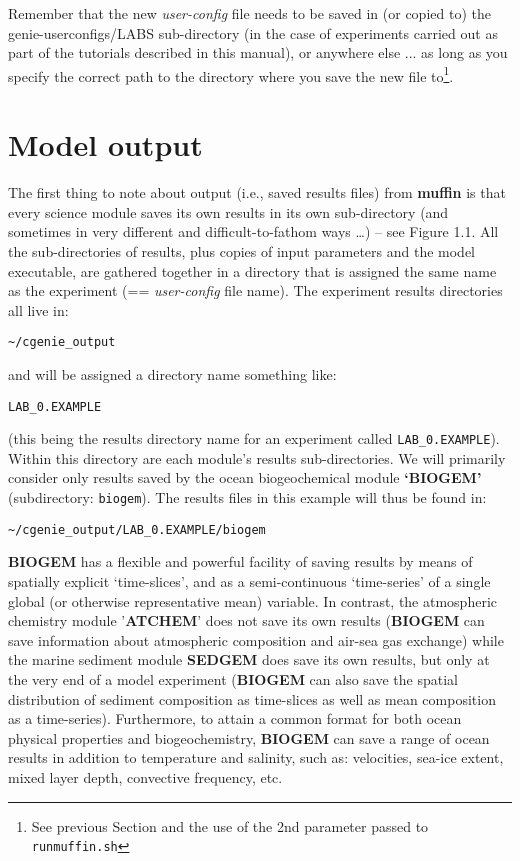 \documentclass[11pt,fleqn]{book} %
\begin{document}
\noindent Remember that the new \textit{user-config} file needs to be saved in (or copied to) the \textsf{\footnotesize genie-userconfigs/LABS} sub-directory (in the case of experiments carried out as part of the tutorials described in this manual), or anywhere else ... as long as you specify the correct path to the directory where you save the new file to\footnote{See previous Section and the use of the 2nd parameter passed to \texttt{runmuffin.sh}}.


\newpage


\section{Model output}

The first thing to note about output (i.e., saved results files) from \textbf{muffin} is that every science module saves its own results in its own sub-directory (and sometimes in very different and difficult-to-fathom ways …) – see Figure 1.1. All the sub-directories of results, plus copies of input parameters and the model executable, are gathered together in a directory that is assigned the same name as the experiment (== \textit{user-config} file name). The experiment results directories all live in:
\begin{verbatim}
~/cgenie_output
\end{verbatim}
and will be assigned a directory name something like:
\begin{verbatim}
LAB_0.EXAMPLE
\end{verbatim}
(this being the results directory name for an experiment called \texttt{LAB\_0.EXAMPLE}). Within this directory are each module’s results sub-directories.
We will primarily consider only results saved by the ocean biogeochemical module \textbf{‘BIOGEM’} (subdirectory: \small\texttt{biogem}\normalsize). The results files in this example will thus be found in:
\begin{verbatim}
~/cgenie_output/LAB_0.EXAMPLE/biogem
\end{verbatim}
\textbf{BIOGEM} has a flexible and powerful facility of saving results by means of spatially explicit ‘time-slices’, and as a semi-continuous ‘time-series’ of a single global (or otherwise representative mean) variable. In contrast, the atmospheric chemistry module '\textbf{ATCHEM}' does not save its own results (\textbf{BIOGEM} can save information about atmospheric composition and air-sea gas exchange) while the marine sediment module \textbf{SEDGEM} does save its own results, but only at the very end of a model experiment (\textbf{BIOGEM} can also save the spatial distribution of sediment composition as time-slices as well as mean composition as a time-series). Furthermore, to attain a common format for both ocean physical properties and biogeochemistry, \textbf{BIOGEM} can save a range of ocean results in addition to temperature and salinity, such as: velocities, sea-ice extent, mixed layer depth, convective frequency, etc.
\end{document}
